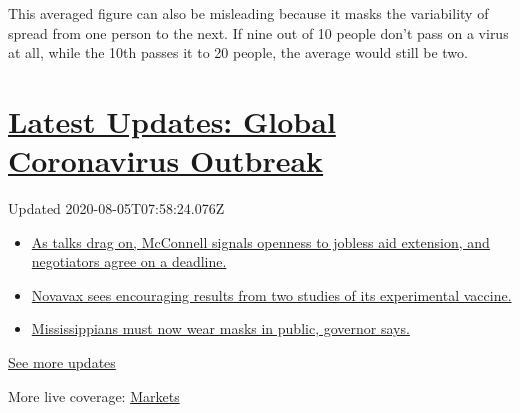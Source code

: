 This averaged figure can also be misleading because it masks the
variability of spread from one person to the next. If nine out of 10
people don't pass on a virus at all, while the 10th passes it to 20
people, the average would still be two.

\hypertarget{latest-updates-global-coronavirus-outbreak}{%
\section{\texorpdfstring{\href{https://www.nytimes3xbfgragh.onion/2020/08/04/world/coronavirus-cases.html?action=click\&pgtype=Article\&state=default\&region=MAIN_CONTENT_1\&context=storylines_live_updates}{Latest
Updates: Global Coronavirus
Outbreak}}{Latest Updates: Global Coronavirus Outbreak}}\label{latest-updates-global-coronavirus-outbreak}}

Updated 2020-08-05T07:58:24.076Z

\begin{itemize}
\tightlist
\item
  \href{https://www.nytimes3xbfgragh.onion/2020/08/04/world/coronavirus-cases.html?action=click\&pgtype=Article\&state=default\&region=MAIN_CONTENT_1\&context=storylines_live_updates\#link-762df92}{As
  talks drag on, McConnell signals openness to jobless aid extension,
  and negotiators agree on a deadline.}
\item
  \href{https://www.nytimes3xbfgragh.onion/2020/08/04/world/coronavirus-cases.html?action=click\&pgtype=Article\&state=default\&region=MAIN_CONTENT_1\&context=storylines_live_updates\#link-1228a480}{Novavax
  sees encouraging results from two studies of its experimental
  vaccine.}
\item
  \href{https://www.nytimes3xbfgragh.onion/2020/08/04/world/coronavirus-cases.html?action=click\&pgtype=Article\&state=default\&region=MAIN_CONTENT_1\&context=storylines_live_updates\#link-794484ed}{Mississippians
  must now wear masks in public, governor says.}
\end{itemize}

\href{https://www.nytimes3xbfgragh.onion/2020/08/04/world/coronavirus-cases.html?action=click\&pgtype=Article\&state=default\&region=MAIN_CONTENT_1\&context=storylines_live_updates}{See
more updates}

More live coverage:
\href{https://www.nytimes3xbfgragh.onion/live/2020/08/04/business/stock-market-today-coronavirus?action=click\&pgtype=Article\&state=default\&region=MAIN_CONTENT_1\&context=storylines_live_updates}{Markets}

